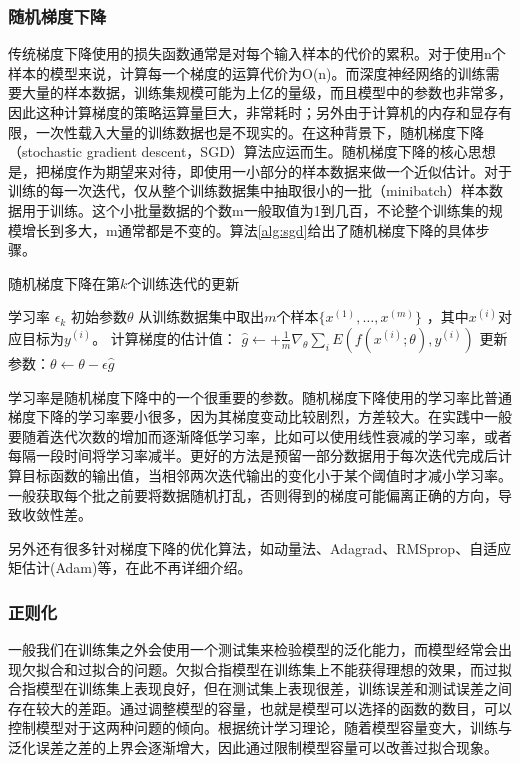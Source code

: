 \subsubsection{随机梯度下降}
传统梯度下降使用的损失函数通常是对每个输入样本的代价的累积。对于使用n个样本的模型来说，计算每一个梯度的运算代价为O(n)。而深度神经网络的训练需要大量的样本数据，训练集规模可能为上亿的量级，而且模型中的参数也非常多，因此这种计算梯度的策略运算量巨大，非常耗时；另外由于计算机的内存和显存有限，一次性载入大量的训练数据也是不现实的。在这种背景下，随机梯度下降（stochastic gradient descent，SGD）算法应运而生。随机梯度下降的核心思想是，把梯度作为期望来对待，即使用一小部分的样本数据来做一个近似估计。对于训练的每一次迭代，仅从整个训练数据集中抽取很小的一批（minibatch）样本数据用于训练。这个小批量数据的个数m一般取值为1到几百，不论整个训练集的规模增长到多大，m通常都是不变的。算法\ref{alg:sgd}给出了随机梯度下降的具体步骤。
\begin{algorithm}[htb]
	\caption{随机梯度下降在第$k$个训练迭代的更新}
	\label{alg:sgd}
	\begin{algorithmic}
		\REQUIRE 学习率 $\epsilon_k$
		\REQUIRE 初始参数$\theta$
		\STATE 从训练数据集中取出$m$个样本$\{ x^{(1)},\dots, x^{(m)}\}$ ，其中$x^{(i)}$对应目标为$y^{(i)}$。
		\STATE 计算梯度的估计值： $\hat{g} \leftarrow + 
		\frac{1}{m} \nabla_{\theta} \sum_i E(f(x^{(i)};\theta),y^{(i)})$
		\STATE 更新参数：$\theta \leftarrow \theta - \epsilon \hat{g}$
		\ENDWHILE
	\end{algorithmic}
\end{algorithm}

学习率是随机梯度下降中的一个很重要的参数。随机梯度下降使用的学习率比普通梯度下降的学习率要小很多，因为其梯度变动比较剧烈，方差较大。在实践中一般要随着迭代次数的增加而逐渐降低学习率，比如可以使用线性衰减的学习率，或者每隔一段时间将学习率减半。更好的方法是预留一部分数据用于每次迭代完成后计算目标函数的输出值，当相邻两次迭代输出的变化小于某个阈值时才减小学习率。一般获取每个批之前要将数据随机打乱，否则得到的梯度可能偏离正确的方向，导致收敛性差。

另外还有很多针对梯度下降的优化算法，如动量法、Adagrad、RMSprop、自适应矩估计(Adam)等，在此不再详细介绍。

\subsubsection{正则化}
一般我们在训练集之外会使用一个测试集来检验模型的泛化能力，而模型经常会出现欠拟合和过拟合的问题。欠拟合指模型在训练集上不能获得理想的效果，而过拟合指模型在训练集上表现良好，但在测试集上表现很差，训练误差和测试误差之间存在较大的差距。通过调整模型的容量，也就是模型可以选择的函数的数目，可以控制模型对于这两种问题的倾向。根据统计学习理论，随着模型容量变大，训练与泛化误差之差的上界会逐渐增大，因此通过限制模型容量可以改善过拟合现象。

